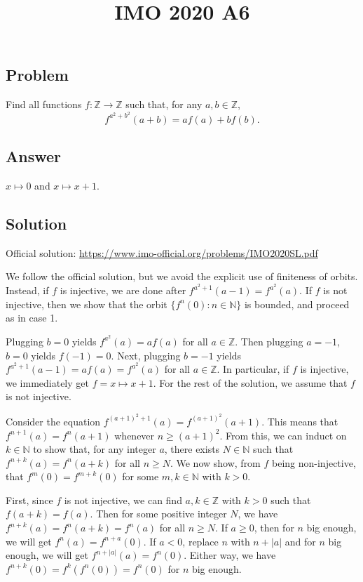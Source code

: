 \documentclass{article}
\title{IMO 2020 A6}
\author{}
\date{}
\newcommand{\N}{\mathbb{N}}
\newcommand{\Z}{\mathbb{Z}}
\begin{document}
\maketitle



\subsection*{Problem}

Find all functions $f : \Z \to \Z$ such that, for any $a, b \in \Z$,
\[ f^{a^2 + b^2}(a + b) = a f(a) + b f(b). \tag{*}\label{2020a6-eq0} \]



\subsection*{Answer}

$x \mapsto 0$ and $x \mapsto x + 1$.



\subsection*{Solution}

Official solution: \url{https://www.imo-official.org/problems/IMO2020SL.pdf}

We follow the official solution, but we avoid the explicit use of finiteness of orbits.
Instead, if $f$ is injective, we are done after $f^{a^2 + 1}(a - 1) = f^{a^2}(a)$.
If $f$ is not injective, then we show that the orbit $\{f^n(0) : n \in \N\}$ is bounded, and proceed as in case 1.

Plugging $b = 0$ yields $f^{a^2}(a) = a f(a)$ for all $a \in \Z$.
Then plugging $a = -1$, $b = 0$ yields $f(-1) = 0$.
Next, plugging $b = -1$ yields $f^{a^2 + 1}(a - 1) = a f(a) = f^{a^2}(a)$ for all $a \in \Z$.
In particular, if $f$ is injective, we immediately get $f = x \mapsto x + 1$.
For the rest of the solution, we assume that $f$ is not injective.

Consider the equation $f^{(a + 1)^2 + 1}(a) = f^{(a + 1)^2}(a + 1)$.
This means that $f^{n + 1}(a) = f^n(a + 1)$ whenever $n \geq (a + 1)^2$.
From this, we can induct on $k \in \N$ to show that, for any integer $a$, there exists $N \in \N$ such that $f^{n + k}(a) = f^n(a + k)$ for all $n \geq N$.
We now show, from $f$ being non-injective, that $f^m(0) = f^{m + k}(0)$ for some $m, k \in \N$ with $k > 0$.

First, since $f$ is not injective, we can find $a, k \in \Z$ with $k > 0$ such that $f(a + k) = f(a)$.
Then for some positive integer $N$, we have $f^{n + k}(a) = f^n(a + k) = f^n(a)$ for all $n \geq N$.
If $a \geq 0$, then for $n$ big enough, we will get $f^n(a) = f^{n + a}(0)$.
If $a < 0$, replace $n$ with $n + |a|$ and for $n$ big enough, we will get $f^{n + |a|}(a) = f^n(0)$.
Either way, we have $f^{n + k}(0) = f^k(f^n(0)) = f^n(0)$ for $n$ big enough.
\end{document}
